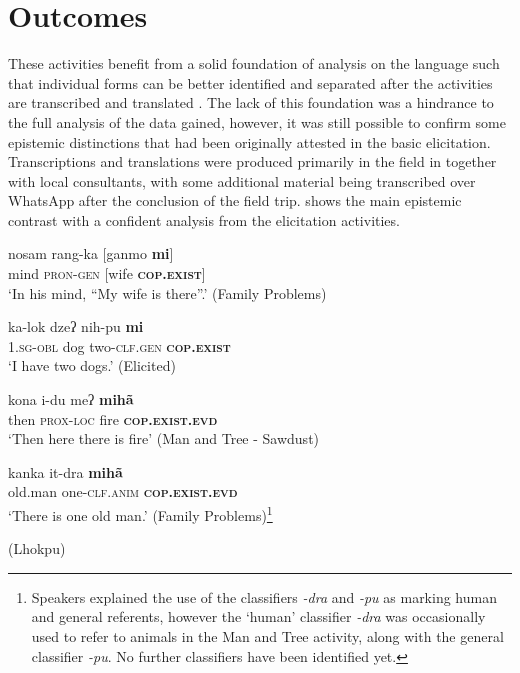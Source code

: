 \section{Outcomes}
These activities benefit from a solid foundation of analysis on the language such that individual forms can be better identified and separated after the activities are transcribed and translated \cite{Bodnaruk2023}. The lack of this foundation was a hindrance to the full analysis of the data gained, however, it was still possible to confirm some epistemic distinctions that had been originally attested in the basic elicitation. Transcriptions and translations were produced primarily in the field in  together with local consultants, with some additional material being transcribed over WhatsApp after the conclusion of the field trip.  shows the main epistemic contrast with a confident analysis from the elicitation activities. 

\begin{exe}
  \ex\label{e:Methods:LhokpuDistinction}
  \begin{xlist}
    \ex\label{e:Methods:LhokpuDistinction:mi1}
    \gll nosam rang-ka [ganmo \textbf{mi}] \\
    mind \textsc{pron-gen} [wife \textbf{\textsc{cop.exist}}] \\
    \glt `In his mind, “My wife is there”.' (Family Problems)

    \ex \label{e:Methods:LhokpuDistinction:mi2}
    \gll ka-lok dzeʔ nih-pu \textbf{mi} \\
    \textsc{1.sg-obl} dog two-\textsc{clf.gen} \textbf{\textsc{cop.exist}} \\
    \glt `I have two dogs.' (Elicited)

    \ex \label{e:Methods:LhokpuDistinction:miha1}
    \gll kona i-du meʔ \textbf{mihã} \\
    then \textsc{prox-loc} fire \textbf{\textsc{cop.exist.evd}} \\
    \glt `Then here there is fire' (Man and Tree - Sawdust)

    \ex \label{e:Methods:LhokpuDistinction:miha2}
    \gll kanka it-dra \textbf{mihã} \\
    old.man one-\textsc{clf.anim}  \textbf{\textsc{cop.exist.evd}} \\
    \glt `There is one old man.' (Family Problems)\footnote{Speakers explained the use of the classifiers \textit{-dra} and \textit{-pu} as marking human and general referents, however the `human' classifier \textit{-dra} was occasionally used to refer to animals in the Man and Tree activity, along with the general classifier \textit{-pu}. No further classifiers have been identified yet.}
  \end{xlist}
  (Lhokpu)
\end{exe}

